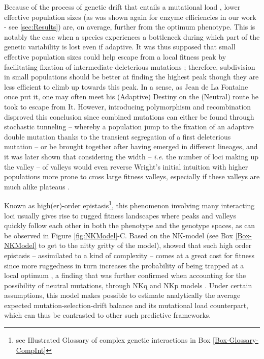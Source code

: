 Because of the process of genetic drift \citep{Wright30,Kimura58,Ohta92,Sella09} that entails a mutational load \citep{Haldane37,Muller50,Agrawal12}, lower effective population sizes (as was shown again for enzyme efficiencies in our work - see \ref{sec:Results}) are, on average, further from the optimum phenotype. This is notably the case when a species experiences a bottleneck \citep{Wright31,Nei75} during which part of the genetic variability is lost even if adaptive. It was thus supposed that small effective population sizes could help escape from a local fitness peak by facilitating fixation of intermediate deleterious mutations \citep{Wright30,Wright32} ; therefore, subdivision in small populations should be better at finding the highest peak though they are less efficient to climb up towards this peak. In a sense, as Jean de La Fontaine once put it, one may often meet his (Adaptive) Destiny on the (Neutral) route he took to escape from It. However, introducing polymorphism and recombination disproved this conclusion \citep{Weinreich05} since combined mutations can either be found through stochastic tunneling \citep{Iwasa04b} -- whereby a population jump to the fixation of an adaptive double mutation thanks to the transient segregation of a first deleterious mutation -- or be brought together after having emerged in different lineages, and it was later shown that considering the width -- \textit{i.e.} the number of loci making up the valley -- of valleys would even reverse Wright's initial intuition with higher populations more prone to cross large fitness valleys, especially if these valleys are much alike plateaus \citep{Weissman09}.

Known as high(er)-order epistasis\footnote{see Illustrated Glossary of complex genetic interactions in Box \ref{Box-Glossary-CompInt}}, this phenomenon involving many interacting loci usually gives rise to rugged fitness landscapes \citep{Kauffman87,Kauffman89,Weinreich13} where peaks and valleys quickly follow each other in both the phenotype and the genotype spaces, as can be observed in Figure \ref{fig:NKModel}-C. Based on the NK-model (see Box \ref{Box-NKModel} to get to the nitty gritty of the model), \citet{Kauffman87} showed that such high order epistasis -- assimilated to a kind of complexity -- comes at a great cost for fitness since more ruggedness in turn increases the probability of being trapped at a local optimum \citep{Kauffman87,Geard02}, a finding that was further confirmed when accounting for the possibility of neutral mutations, through NKq and NKp models \citep{Barnett98,Newman98,Geard02}. Under certain assumptions, this model makes possible to estimate analytically the average expected mutation-selection-drift balance \citep{Weinberger91} and its mutational load counterpart, which can thus be contrasted to other such predictive frameworks.

